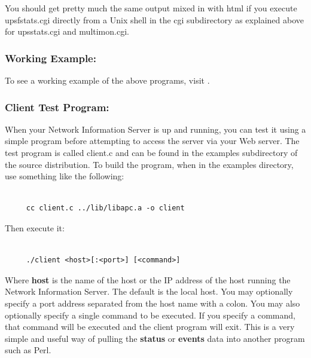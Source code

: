 {{{{{{{{You should get pretty much the same output mixed in with html if you execute
upsfstats.cgi directly from a Unix shell in the cgi subdirectory as explained
above for upsstats.cgi and multimon.cgi. 

\label{Working-Example}

\subsubsection*{Working Example:}

\label{index-CGI_002c-working-example-134}
\label{index-Example_002c-CGI-135}
To see a working example of the above programs, visit 
. 

\label{Client-Test-Program}

\subsubsection*{Client Test Program:}

\label{index-Client-Test-program-136}
When your Network Information Server is up and running, you can test it using
a simple program before attempting to access the server via your Web server.
The test program is called client.c and can be found in the examples
subdirectory of the source distribution. To build the program, when in the
examples directory, use something like the following: 

\footnotesize
\begin{verbatim}
     
     cc client.c ../lib/libapc.a -o client
\end{verbatim}
\normalsize

Then execute it: 

\footnotesize
\begin{verbatim}
     
     ./client <host>[:<port>] [<command>]
\end{verbatim}
\normalsize

Where {\bf host} is the name of the host or the IP address of the host running
the Network Information Server. The default is the local host. You may
optionally specify a port address separated from the host name with a colon.
You may also optionally specify a single command to be executed. If you
specify a command, that command will be executed and the client program will
exit. This is a very simple and useful way of pulling the {\bf status} or {\bf
events} data into another program such as Perl.  

}}}}}}}}
